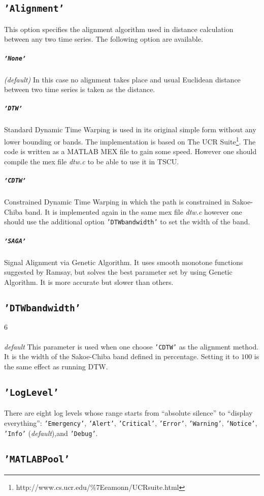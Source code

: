 \documentclass{article}
\begin{document}
\subsection{\texttt{'Alignment'}} 
This option specifies the alignment algorithm used in distance calculation between any two time series. The following option are available.
\subparagraph*{\texttt{'None'}} {\it (default)} In this case no alignment takes place and usual Euclidean distance between two time series is taken as the distance.
\subparagraph*{\texttt{'DTW'}} Standard Dynamic Time Warping is used in its original simple form without any lower bounding or bands. The implementation is based on The UCR Suite\footnote{http://www.cs.ucr.edu/\%7Eeamonn/UCRsuite.html}. The code is written as a MATLAB MEX file to gain some speed. However one should compile the mex file {\it dtw.c} to be able to use it in TSCU. 
\subparagraph*{\texttt{'CDTW'}} Constrained Dynamic Time Warping in which the path is constrained in Sakoe-Chiba band. It is implemented again in the same mex file {\it dtw.c} however one should use the additional option \texttt{'DTWbandwidth'} to set the width of the band.
\subparagraph*{\texttt{'SAGA'}} Signal Alignment via Genetic Algorithm. It uses smooth monotone functions suggested by Ramsay\cite{Ramsay1998}, but solves the best parameter set by using Genetic Algorithm\cite{Kaya2013113}. It is more accurate but slower than others.

\subsection{\texttt{'DTWbandwidth'}} 
\subparagraph*{$6$} {\it default} This parameter is used when one choose \texttt{'CDTW'} as the alignment method. It is the width of the Sakoe-Chiba band defined in percentage. Setting it to $100$ is the same effect as running DTW.

\subsection{\texttt{'LogLevel'}}
There are eight log levels whose range starts from ``absolute silence'' to ``display everything'': \texttt{'Emergency'}, \texttt{'Alert'}, \texttt{'Critical'}, \texttt{'Error'}, \texttt{'Warning'}, \texttt{'Notice'}, \texttt{'Info'} ({\it default}),and \texttt{'Debug'}.  

\subsection{\texttt{'MATLABPool'}}
\end{document}

